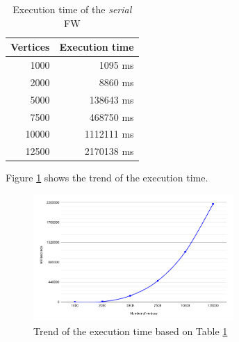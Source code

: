 \begin{table}[h!]
\centering
\begin{tabular}{|r|r|}
\hline
\rowcolor[HTML]{3166FF} 
{\color[HTML]{FFFFFF} \textbf{Vertices}} & {\color[HTML]{FFFFFF} \textbf{Execution time}} \\ \hline
1000                                     & 1095 ms                                        \\ \hline
2000                                     & 8860 ms                                        \\ \hline
5000                                     & 138643 ms                                      \\ \hline
7500                                     & 468750 ms                                      \\ \hline
10000                                    & 1112111 ms                                     \\ \hline
12500                                    & 2170138 ms                                     \\ \hline
\end{tabular}
\caption{Execution time of the \emph{serial} FW}                                                                                                                                            
\label{tab:seq-time} 
\end{table}

Figure \ref*{fig:seq-time} shows the trend of the execution time. 

\begin{figure}[h!]
\centering                                                                        
\includegraphics[width=3in]{images/seq-time}
\captionsetup{justification=centering,margin=2cm}                                                                                                                                   
\caption{Trend of the execution time based on Table \ref*{tab:seq-time}}                                                                                                                                            
\label{fig:seq-time}                                                                                                                                                           
\end{figure}


